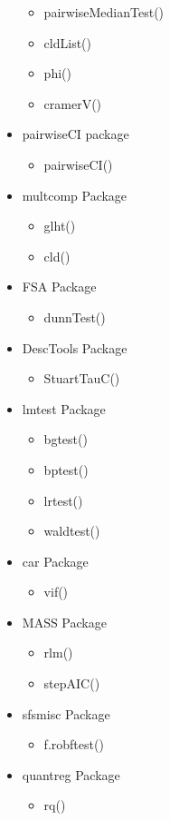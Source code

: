 \documentclass{article}
\begin{document}
\begin{multicols}{3}
\begin{itemize}
\begin{itemize}
  \item pairwiseMedianTest()
  \item cldList()
  \item phi()
  \item cramerV()
  \end{itemize}
  \item pairwiseCI package
  \begin{itemize}
  \item pairwiseCI()
  \end{itemize}
  \item multcomp Package
  \begin{itemize}
  \item glht()
  \item cld()
  \end{itemize}
  \item FSA Package
  \begin{itemize}
  \item dunnTest()
  \end{itemize}
  \item DescTools Package
  \begin{itemize}
  \item StuartTauC()
  \end{itemize}
  \item lmtest Package
  \begin{itemize}
  \item bgtest()
  \item bptest()
  \item lrtest()
  \item waldtest()
  \end{itemize}
  \item car Package
  \begin{itemize}
  \item vif()
  \end{itemize}
  \item MASS Package
  \begin{itemize}
  \item rlm()
  \item stepAIC()
  \end{itemize}
  \item sfsmisc Package
  \begin{itemize}
  \item f.robftest()
  \end{itemize}
  \item quantreg Package
  \begin{itemize}
  \item rq()

\end{itemize}
\end{itemize}
\end{multicols}
\end{document}
